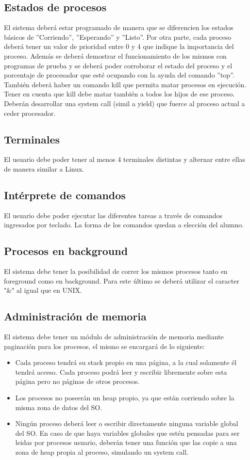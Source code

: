 \documentclass[a4paper,10pt]{article}
\begin{document}
\subsection{Estados de procesos}
El sistema deberá estar programado de manera que se diferencien los estados
básicos de ”Corriendo”, ”Esperando” y ”Listo”. Por otra parte, cada proceso
deberá tener un valor de prioridad entre 0 y 4 que indique la importancia del
proceso. Además se deberá demostrar el funcionamiento de los mismos con
programas de prueba y se deberá poder corroborar el estado del proceso y el
porcentaje de procesador que esté ocupando con la ayuda del comando ”top”.
También deberá haber un comando kill que permita matar procesos en ejecución.
Tener en cuenta que kill debe matar también a todos los hijos de ese proceso.
Deberán desarrollar una system call (simil a yield) que fuerce al proceso actual
a ceder procesador.

\subsection{Terminales}
El usuario debe poder tener al menos 4 terminales distintas y alternar entre
ellas de manera similar a Linux.

\subsection{Intérprete de comandos}
El usuario debe poder ejecutar las diferentes tareas a través de comandos ingresados 
por teclado. La forma de los comandos quedan a elección del alumno.

\subsection{Procesos en background}
El sistema debe tener la posibilidad de correr los mismos procesos tanto en
foreground como en background. Para este último se deberá utilizar el caracter
"\&" al igual que en UNIX.

\subsection{Administración de memoria}
El sistema debe tener un módulo de administración de memoria mediante paginación 
para los procesos, el mismo se encargará de lo siguiente:

\begin{itemize}
 \item Cada proceso tendrá su stack propio en una página, a la cual solamente él
	tendrá acceso. Cada proceso podrá leer y escribir libremente sobre esta
	página pero no páginas de otros procesos.      
 \item Los procesos no poseerán un heap propio, ya que están corriendo sobre la
	misma zona de datos del SO.
 \item Ningún proceso deberá leer o escribir directamente ninguna variable global
	del SO. En caso de que haya variables globales que estén pensadas para
	ser leidas por procesos usuario, deberán tener una función que las copie a
	una zona de heap propia al proceso, simulando un system call.
\end{itemize}
\end{document}
